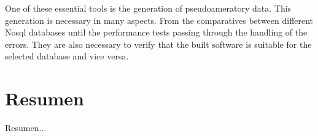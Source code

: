 One of these essential tools is the generation of pseudoameratory data. This generation is necessary in many aspects. From the comparatives between different Nosql databases until the performance tests passing through the handling of the errors.
They are also necessary to verify that the built software is suitable for the selected database and vice versa.

\chapter*{Resumen\label{00summary}}

Resumen...

